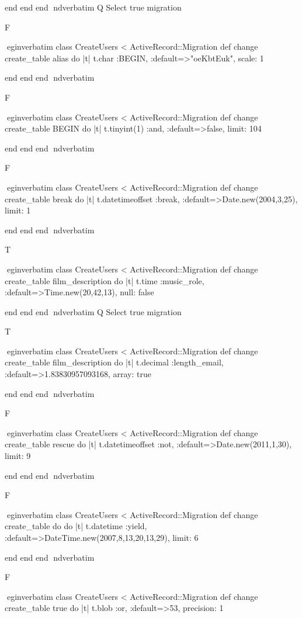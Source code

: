     end 
  end 
end
nd{verbatim}
Q
 Select true migration

F

egin{verbatim}
 class CreateUsers < ActiveRecord::Migration 
  def change 
    create_table alias do |t| 
      t.char :BEGIN, :default=>"oeKbtEuk", scale: 1
    
    end 
  end 
end
nd{verbatim}

F

egin{verbatim}
 class CreateUsers < ActiveRecord::Migration 
  def change 
    create_table BEGIN do |t| 
      t.tinyint(1) :and, :default=>false, limit: 104
    
    end 
  end 
end
nd{verbatim}

F

egin{verbatim}
 class CreateUsers < ActiveRecord::Migration 
  def change 
    create_table break do |t| 
      t.datetimeoffset :break, :default=>Date.new(2004,3,25), limit: 1
    
    end 
  end 
end
nd{verbatim}

T

egin{verbatim}
 class CreateUsers < ActiveRecord::Migration 
  def change 
    create_table film_description do |t| 
      t.time :music_role, :default=>Time.new(20,42,13), null: false
    
    end 
  end 
end
nd{verbatim}
Q
 Select true migration

T

egin{verbatim}
 class CreateUsers < ActiveRecord::Migration 
  def change 
    create_table film_description do |t| 
      t.decimal :length_email, :default=>1.83830957093168, array: true
    
    end 
  end 
end
nd{verbatim}

F

egin{verbatim}
 class CreateUsers < ActiveRecord::Migration 
  def change 
    create_table rescue do |t| 
      t.datetimeoffset :not, :default=>Date.new(2011,1,30), limit: 9
    
    end 
  end 
end
nd{verbatim}

F

egin{verbatim}
 class CreateUsers < ActiveRecord::Migration 
  def change 
    create_table do do |t| 
      t.datetime :yield, :default=>DateTime.new(2007,8,13,20,13,29), limit: 6
    
    end 
  end 
end
nd{verbatim}

F

egin{verbatim}
 class CreateUsers < ActiveRecord::Migration 
  def change 
    create_table true do |t| 
      t.blob :or, :default=>53, precision: 1
    
